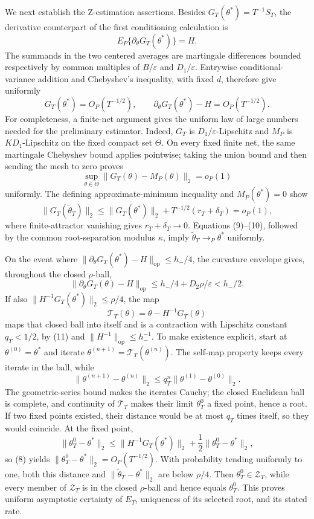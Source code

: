 We next establish the Z-estimation assertions.  Besides \(G_T(\theta^*)=T^{-1}S_T\), the derivative counterpart of the first conditioning calculation is
\[
 E_P\{\partial_\theta G_T(\theta^*)\}=H.
\]
The summands in the two centered averages are martingale differences bounded respectively by common multiples of \(B/\varepsilon\) and \(D_1/\varepsilon\).  Entrywise conditional-variance addition and Chebyshev's inequality, with fixed \(d\), therefore give uniformly
\[
 G_T(\theta^*)=O_P(T^{-1/2}),
 \qquad
 \partial_\theta G_T(\theta^*)-H=O_P(T^{-1/2}).                            \tag{8}
\]
For completeness, a finite-net argument gives the uniform law of large numbers needed for the preliminary estimator.  Indeed, \(G_T\) is \(D_1/\varepsilon\)-Lipschitz and \(M_P\) is \(KD_1\)-Lipschitz on the fixed compact set \(\Theta\).  On every fixed finite net, the same martingale Chebyshev bound applies pointwise; taking the union bound and then sending the mesh to zero proves
\[
 \sup_{\theta\in\Theta}\|G_T(\theta)-M_P(\theta)\|_2=o_P(1)               \tag{9}
\]
uniformly.  The defining approximate-minimum inequality and \(M_P(\theta^*)=0\) show
\[
 \|G_T(\widetilde\theta_T)\|_2
 \le \|G_T(\theta^*)\|_2+T^{-1/2}(r_T+\delta_T)=o_P(1),                  \tag{10}
\]
where finite-attractor vanishing gives \(r_T+\delta_T\to0\).  Equations (9)--(10), followed by the common root-separation modulus \(\kappa\), imply \(\widetilde\theta_T\to_P\theta^*\) uniformly.

On the event where \(\|\partial_\theta G_T(\theta^*)-H\|_{\mathrm{op}}\le h_-/4\), the curvature envelope gives, throughout the closed \(\rho\)-ball,
\[
 \|\partial_\theta G_T(\theta)-H\|_{\mathrm{op}}
 \le h_-/4+D_2\rho/\varepsilon<h_-/2.                                    \tag{11}
\]
If also \(\|H^{-1}G_T(\theta^*)\|_2\le\rho/4\), the map
\[
 \mathcal T_T(\theta)=\theta-H^{-1}G_T(\theta)
\]
maps that closed ball into itself and is a contraction with Lipschitz constant \(q_T<1/2\), by (11) and \(\|H^{-1}\|_{\mathrm{op}}\le h_-^{-1}\).  To make existence explicit, start at \(\theta^{(0)}=\theta^*\) and iterate \(\theta^{(n+1)}=\mathcal T_T(\theta^{(n)})\).  The self-map property keeps every iterate in the ball, while
\[
 \|\theta^{(n+1)}-\theta^{(n)}\|_2\le q_T^n\|\theta^{(1)}-\theta^{(0)}\|_2.
\]
The geometric-series bound makes the iterates Cauchy; the closed Euclidean ball is complete, and continuity of \(\mathcal T_T\) makes their limit \(\theta_T^0\) a fixed point, hence a root.  If two fixed points existed, their distance would be at most \(q_T\) times itself, so they would coincide.  At the fixed point,
\[
 \|\theta_T^0-\theta^*\|_2
 \le \|H^{-1}G_T(\theta^*)\|_2+ \frac12\|\theta_T^0-\theta^*\|_2,
\]
so (8) yields \(\|\theta_T^0-\theta^*\|_2=O_P(T^{-1/2})\).  With probability tending uniformly to one, both this distance and \(\|\widetilde\theta_T-\theta^*\|_2\) are below \(\rho/4\).  Then \(\theta_T^0\in\mathcal Z_T\), while every member of \(\mathcal Z_T\) is in the closed \(\rho\)-ball and hence equals \(\theta_T^0\).  This proves uniform asymptotic certainty of \(E_T\), uniqueness of its selected root, and its stated rate.

